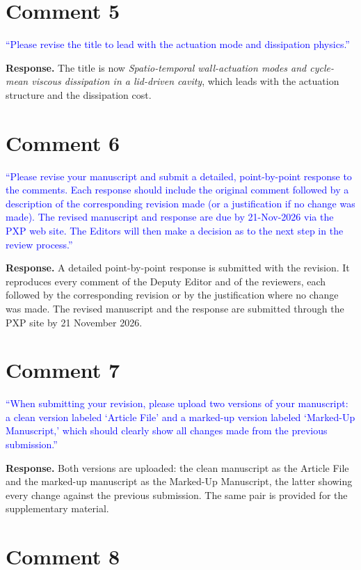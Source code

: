 \documentclass[11pt,a4paper]{article}
\begin{document}
\section*{Comment 5}

\noindent\textcolor{blue}{``Please revise the title to lead with the actuation
mode and dissipation physics.''}

\textbf{Response.} The title is now \textit{Spatio-temporal wall-actuation
modes and cycle-mean viscous dissipation in a lid-driven cavity}, which leads
with the actuation structure and the dissipation cost.

\section*{Comment 6}

\noindent\textcolor{blue}{``Please revise your manuscript and submit a
detailed, point-by-point response to the comments. Each response should
include the original comment followed by a description of the corresponding
revision made (or a justification if no change was made). The revised
manuscript and response are due by 21-Nov-2026 via the PXP web site. The
Editors will then make a decision as to the next step in the review
process.''}

\textbf{Response.} A detailed point-by-point response is submitted with the
revision. It reproduces every comment of the Deputy Editor and of the
reviewers, each followed by the corresponding revision or by the justification
where no change was made. The revised manuscript and the response are
submitted through the PXP site by 21 November 2026.

\section*{Comment 7}

\noindent\textcolor{blue}{``When submitting your revision, please upload two
versions of your manuscript: a clean version labeled `Article File' and a
marked-up version labeled `Marked-Up Manuscript,' which should clearly show
all changes made from the previous submission.''}

\textbf{Response.} Both versions are uploaded: the clean manuscript as the
Article File and the marked-up manuscript as the Marked-Up Manuscript, the
latter showing every change against the previous submission. The same pair is
provided for the supplementary material.

\section*{Comment 8}
\end{document}
